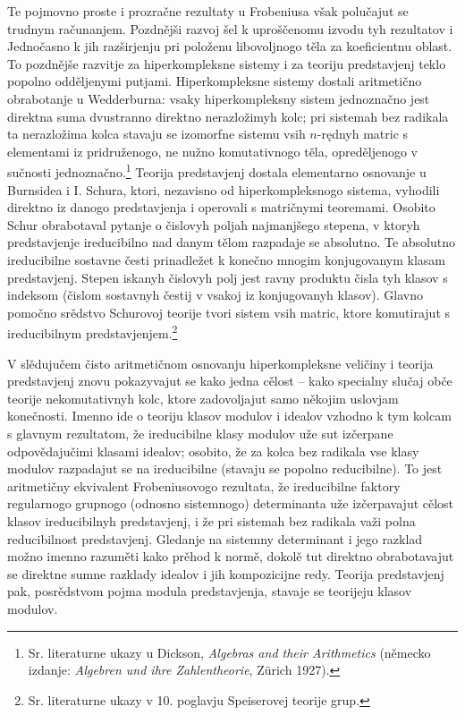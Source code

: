\documentclass[11pt]{article}
\begin{document}
Te pojmovno proste i prozračne rezultaty u Frobeniusa však polučajut se trudnym računanjem. Pozdnějši razvoj šel k uproščenomu izvodu tyh rezultatov i Jednočasno k jih razširjenju pri položenu libovoljnogo těla za koeficientnu oblast. To pozdnějše razvitje za hiperkompleksne sistemy i za teoriju predstavjenj teklo popolno odděljenymi putjami. Hiperkompleksne sistemy dostali aritmetično obrabotanje u Wedderburna: vsaky hiperkompleksny sistem jednoznačno jest direktna suma dvustranno direktno nerazložimyh kolc; pri sistemah bez radikala ta nerazložima kolca stavaju se izomorfne sistemu vsih $n$-rędnyh matric s elementami iz pridruženogo, ne nužno komutativnogo těla, opreděljenogo v sučnosti jednoznačno.\footnote{Sr. literaturne ukazy u Dickson, \emph{Algebras and their Arithmetics} (německo izdanje: \emph{Algebren und ihre Zahlentheorie}, Zürich 1927).} Teorija predstavjenj dostala elementarno osnovanje u Burnsidea i I. Schura, ktori, nezavisno od hiperkompleksnogo sistema, vyhodili direktno iz danogo predstavjenja i operovali s matričnymi teoremami. Osobito Schur obrabotaval pytanje o čislovyh poljah najmanjšego stepena, v ktoryh predstavjenje ireducibilno nad danym tělom razpadaje se absolutno. Te absolutno ireducibilne sostavne česti prinadležet k konečno mnogim konjugovanym klasam predstavjenj. Stepen iskanyh čislovyh polj jest ravny produktu čisla tyh klasov s indeksom (čislom sostavnyh čestij v vsakoj iz konjugovanyh klasov). Glavno pomočno srědstvo Schurovoj teorije tvori sistem vsih matric, ktore komutirajut s ireducibilnym predstavjenjem.\footnote{Sr. literaturne ukazy v 10. poglavju Speiserovej teorije grup.}

V slědujučem čisto aritmetičnom osnovanju hiperkompleksne veličiny i teorija predstavjenj znovu pokazyvajut se kako jedna cělost -- kako specialny slučaj obče teorije nekomutativnyh kolc, ktore zadovoljajut samo někojim uslovjam konečnosti. Imenno ide o teoriju klasov modulov i idealov vzhodno k tym kolcam s glavnym rezultatom, že ireducibilne klasy modulov uže sut izčerpane odpovědajučimi klasami idealov; osobito, že za kolca bez radikala vse klasy modulov razpadajut se na ireducibilne (stavaju se popolno reducibilne). To jest aritmetičny ekvivalent Frobeniusovogo rezultata, že ireducibilne faktory regularnogo grupnogo (odnosno sistemnogo) determinanta uže izčerpavajut cělost klasov ireducibilnyh predstavjenj, i že pri sistemah bez radikala važi polna reducibilnost predstavjenj. Gledanje na sistemny determinant i jego razklad možno imenno razuměti kako prěhod k normě, dokolě tut direktno obrabotavajut se direktne sumne razklady idealov i jih kompozicijne redy. Teorija predstavjenj pak, posrědstvom pojma modula predstavjenja, stavaje se teorijeju klasov modulov.
\end{document}
